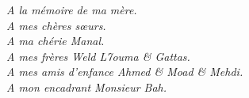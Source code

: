 \cleardoublepage


\begin{acknowledgements}
\begin{flushright}
\emph{
A la mémoire de ma mère.\\
A mes chères sœurs.\\
A ma chérie Manal.\\
A mes frères Weld L7ouma \& Gattas.\\
A mes amis d'enfance Ahmed \& Moad \& Mehdi.\\
A mon encadrant Monsieur Bah.
}
\end{flushright}
\end{acknowledgements}